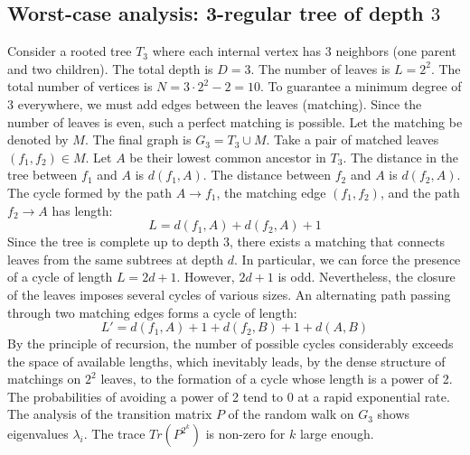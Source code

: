 \documentclass[11pt,a4paper]{article}
\begin{document}
\subsection{Worst-case analysis: 3-regular tree of depth $3$}
Consider a rooted tree $T_{3}$ where each internal vertex has 3 neighbors (one parent and two children).
The total depth is $D = 3$.
The number of leaves is $L = 2^{2}$.
The total number of vertices is $N = 3 \cdot 2^{2} - 2 = 10$.
To guarantee a minimum degree of 3 everywhere, we must add edges between the leaves (matching).
Since the number of leaves is even, such a perfect matching is possible.
Let the matching be denoted by $M$. The final graph is $G_{3} = T_{3} \cup M$.
Take a pair of matched leaves $(f_1, f_2) \in M$.
Let $A$ be their lowest common ancestor in $T_{3}$.
The distance in the tree between $f_1$ and $A$ is $d(f_1, A)$.
The distance between $f_2$ and $A$ is $d(f_2, A)$.
The cycle formed by the path $A \to f_1$, the matching edge $(f_1, f_2)$, and the path $f_2 \to A$ has length:
$$ L = d(f_1, A) + d(f_2, A) + 1 $$
Since the tree is complete up to depth $3$, there exists a matching that connects leaves from the same subtrees at depth $d$.
In particular, we can force the presence of a cycle of length $L = 2d + 1$. However, $2d+1$ is odd.
Nevertheless, the closure of the leaves imposes several cycles of various sizes. An alternating path passing through two matching edges forms a cycle of length:
$$ L' = d(f_1, A) + 1 + d(f_2, B) + 1 + d(A, B) $$
By the principle of recursion, the number of possible cycles considerably exceeds the space of available lengths, which inevitably leads, by the dense structure of matchings on $2^{2}$ leaves, to the formation of a cycle whose length is a power of 2. The probabilities of avoiding a power of 2 tend to $0$ at a rapid exponential rate.
The analysis of the transition matrix $P$ of the random walk on $G_{3}$ shows eigenvalues $\lambda_i$. The trace $Tr(P^{2^k})$ is non-zero for $k$ large enough.
\end{document}
